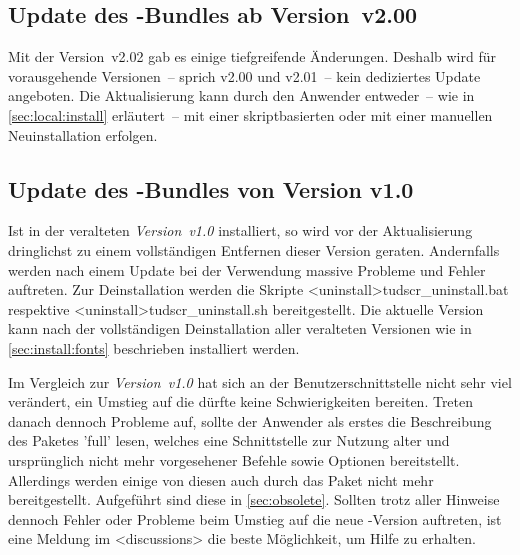 \subsection{Update des \TUDScript-Bundles ab Version~v2.00}
%
Mit der Version~v2.02 gab es einige tiefgreifende Änderungen. Deshalb wird für 
vorausgehende Versionen~-- sprich v2.00 und v2.01~-- kein dediziertes Update 
angeboten. Die Aktualisierung kann durch den Anwender entweder~-- wie in 
\autoref{sec:local:install} erläutert~-- mit einer skriptbasierten oder mit 
einer manuellen Neuinstallation erfolgen.%
%



\subsection{Update des \TUDScript-Bundles von Version v1.0}
%
Ist \TUDScript in der veralteten \emph{Version~v1.0} installiert, so wird vor 
der Aktualisierung dringlichst zu einem vollständigen Entfernen dieser Version 
geraten. Andernfalls werden nach einem Update bei der Verwendung massive 
Probleme und Fehler auftreten. Zur Deinstallation werden die Skripte 
\GitHubDownload*<uninstall>{tudscr_uninstall.bat} respektive
\GitHubDownload*<uninstall>{tudscr_uninstall.sh} bereitgestellt. Die aktuelle 
Version~\vTUDScript{} kann nach der vollständigen Deinstallation aller 
veralteten Versionen wie in \autoref{sec:install:fonts} beschrieben installiert 
werden.

Im Vergleich zur \emph{Version~v1.0} hat sich an der Benutzerschnittstelle 
nicht sehr viel verändert, ein Umstieg auf die  dürfte 
keine Schwierigkeiten bereiten. Treten danach dennoch Probleme auf, sollte der 
Anwender als erstes die Beschreibung des Paketes 'full' 
lesen, welches eine Schnittstelle zur Nutzung alter und ursprünglich nicht mehr 
vorgesehener Befehle sowie Optionen bereitstellt. Allerdings werden einige von 
diesen auch durch das Paket  nicht mehr bereitgestellt. 
Aufgeführt sind diese in \autoref{sec:obsolete}. Sollten trotz aller Hinweise 
dennoch Fehler oder Probleme beim Umstieg auf die neue \TUDScript-Version 
auftreten, ist eine Meldung im \GitHubRepo<discussions> die beste Möglichkeit, 
um Hilfe zu erhalten.



